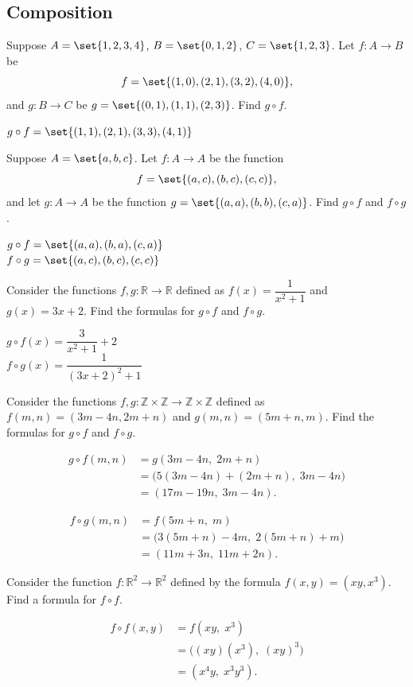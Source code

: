 \documentclass[DIN, pagenumber=false, fontsize=11pt, parskip=half]{scrartcl}
\begin{document}
\subsection{Composition}

\begin{problems}
    \problem Suppose $A = \set{1,2,3,4}$, $B = \set{0,1,2}$, $C = \set{1,2,3}$. Let $f : A \to B$ be
    \[
        f = \set{(1,0),(2,1),(3,2),(4,0)},
    \]
    and $g : B \to C$ be $g = \set{(0,1),(1,1),(2,3)}$. Find $g \circ f$.

    \answer $g \circ f = \set{(1,1),(2,1),(3,3),(4,1)}$

    \problem Suppose $A = \set{a,b,c}$. Let $f : A \to A$ be the function
    \[
        f = \set{(a,c),(b,c),(c,c)},
    \]
    and let $g : A \to A$ be the function $g = \set{(a,a),(b,b),(c,a)}$. Find $g \circ f$ and $f \circ g$.

    \answer $g \circ f = \set{(a,a),(b,a),(c,a)}$\\ 
    $f \circ g = \set{(a,c),(b,c),(c,c)}$


    \problem Consider the functions $f,g : \mathbb{R} \to \mathbb{R}$ defined as $f(x) = \dfrac{1}{x^2+1}$ and $g(x) = 3x+2$. Find the formulas for $g \circ f$ and $f \circ g$.

    \answer $g \circ f(x) = \dfrac{3}{x^2+1} + 2$\\ 
    $f \circ g(x) = \dfrac{1}{(3x+2)^2+1}$

    \problem Consider the functions $f,g : \mathbb{Z} \times \mathbb{Z} \to \mathbb{Z} \times \mathbb{Z}$ defined as $f(m,n) = (3m-4n, 2m+n)$ and $g(m,n) = (5m+n, m)$. Find the formulas for $g \circ f$ and $f \circ g$.

    \answer 
    \begin{align*}
        g \circ f(m,n) &= g(3m-4n,\; 2m+n)\\
                       &= \big(5(3m-4n) + (2m+n),\; 3m-4n\big)\\
                       &= (17m - 19n,\; 3m - 4n).
    \end{align*}
    
    \begin{align*}
        f \circ g(m,n) &= f(5m+n,\; m)\\
                       &= \big(3(5m+n) - 4m,\; 2(5m+n) + m\big)\\
                       &= (11m + 3n,\; 11m + 2n).
    \end{align*}

    \problem Consider the function $f : \mathbb{R}^2 \to \mathbb{R}^2$ defined by the formula $f(x,y) = (xy, x^3)$. Find a formula for $f \circ f$.

    \answer
    \begin{align*}
        f \circ f(x,y) &= f(xy,\; x^3)\\
                       &= \big((xy)(x^3),\; (xy)^3\big)\\
                       &= (x^4y,\; x^3y^3).
    \end{align*}
\end{problems}
\end{document}

